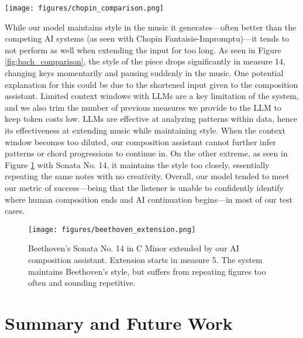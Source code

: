 \documentclass[conference]{IEEEtran}
\begin{document}
\begin{figure*}[t]
\centering
\texttt{[image: figures/chopin\_comparison.png]}
\caption{Comparison of extension of Chopin's Fantaisie-Impromptu between our composition assistant (left) and StaccatoAI \cite{staccato} (right). Extension starts in measure 5. Our system demonstrates better stylistic continuity while StaccatoAI \cite{staccato} produces rhythmically similar but melodically nonsensical output.}
\label{fig:chopin_comparison}
\end{figure*} 

While our model maintains style in the music it generates—often better than the competing AI systems (as seen with Chopin Fantaisie-Impromptu)—it tends to not perform as well when extending the input for too long. As seen in Figure \ref{fig:bach_comparison}, the style of the piece drops significantly in measure 14, changing keys momentarily and pausing suddenly in the music. One potential explanation for this could be due to the shortened input given to the composition assistant. Limited context windows with LLMs are a key limitation of the system, and we also trim the number of previous measures we provide to the LLM to keep token costs low. LLMs are effective at analyzing patterns within data, hence its effectiveness at extending music while maintaining style. When the context window becomes too diluted, our composition assistant cannot further infer patterns or chord progressions to continue in. On the other extreme, as seen in Figure \ref{fig:beethoven_extension} with Sonata No. 14, it maintains the style too closely, essentially repeating the same notes with no creativity.  
Overall, our model tended to meet our metric of success—being that the listener is unable to confidently identify where human composition ends and AI continuation begins—in most of our test cases.  

\begin{figure}[H]
    \centering
    \texttt{[image: figures/beethoven\_extension.png]}
    \caption{Beethoven's Sonata No. 14 in C Minor extended by our AI composition assistant. Extension starts in measure 5. The system maintains Beethoven's style, but suffers from repeating figures too often and sounding repetitive.}
    \label{fig:beethoven_extension}
    \end{figure} 

\section{Summary and Future Work}
\end{document}
